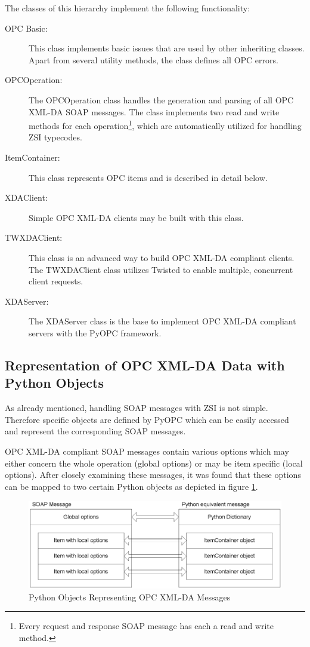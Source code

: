 The classes of this hierarchy implement the following functionality:

\begin{description}
\item[OPC Basic:] This class implements basic issues that are used by
other inheriting classes. Apart from several utility methods, the
class defines all OPC errors.
\item[OPCOperation:] The OPCOperation class handles the generation and
parsing of all OPC XML-DA SOAP messages. The class implements two read
and write methods for each operation\footnote{Every request and
response SOAP message has each a read and write method.}, which are
automatically utilized for handling ZSI typecodes.
\item[ItemContainer:] This class represents OPC items and is
described in detail below.
\item[XDAClient:] Simple OPC XML-DA clients may be built with this
class.
\item[TWXDAClient:] This class is an advanced way to build OPC XML-DA
compliant clients. The TWXDAClient class utilizes Twisted to enable
multiple, concurrent client requests.
\item[XDAServer:] The XDAServer class is the base to implement OPC
XML-DA compliant servers with the PyOPC framework.
\end{description}

\subsection {Representation of OPC XML-DA Data with Python Objects}

As already mentioned, handling SOAP messages with ZSI is not
simple. Therefore specific objects are defined by PyOPC which can be
easily accessed and represent the corresponding SOAP messages.

OPC XML-DA compliant SOAP messages contain various options which may
either concern the whole operation (global options) or may be item
specific (local options).  After closely examining these messages, it
was found that these options can be mapped to two certain Python
objects as depicted in figure \ref{message_basic}.

\begin{figure}[ht]
\centering
\includegraphics[scale=0.7]{graphics/message_basic.eps}
\caption{Python Objects Representing OPC XML-DA Messages}
\label {message_basic} 
\end{figure}

